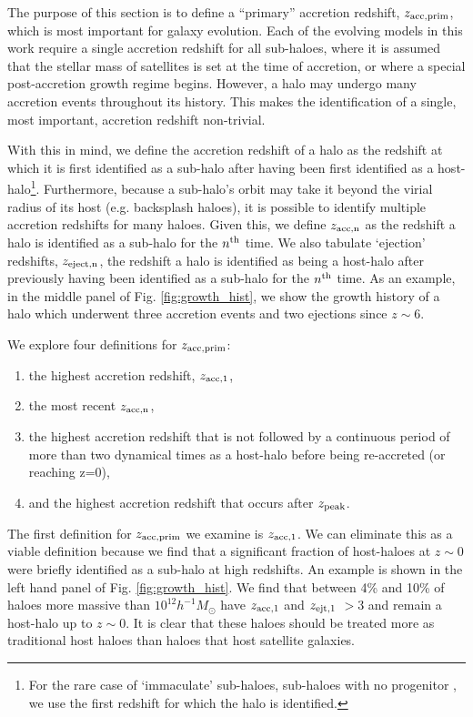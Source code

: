 \documentclass[useAMS,fleqn,usenatbib]{mnras}
\begin{document}
The purpose of this section is to define a ``primary'' accretion redshift, $z_{\rm acc, prim}$, which is most important for galaxy evolution.  Each of the evolving models in this work require a single accretion redshift for all sub-haloes, where it is assumed that the stellar mass of satellites is set at the time of accretion, or where a special post-accretion growth regime begins.  However, a halo may undergo many accretion events throughout its history.  This makes the identification of a single, most important, accretion redshift non-trivial.

With this in mind, we define the accretion redshift of a halo as the redshift at which it is first identified as a sub-halo after having been first identified as a host-halo\footnote{For the rare case of `immaculate' sub-haloes, sub-haloes with no progenitor \citep{vandenBosch:2017fj}, we use the first redshift for which the halo is identified.}.  Furthermore, because a sub-halo's orbit may take it beyond the virial radius of its host (e.g. backsplash haloes), it is possible to identify multiple accretion redshifts for many haloes.  Given this, we define $z_{\rm acc,n}$ as the redshift a halo is identified as a sub-halo for the $n^{\rm th}$ time.  We also tabulate `ejection' redshifts, $z_{\rm eject, n}$, the redshift a halo is identified as being a host-halo after previously having been identified as a sub-halo for the $n^{\rm th}$ time.  As an example, in the middle panel of Fig. \ref{fig:growth_hist}, we show the growth history of a halo which underwent three accretion events and two ejections since $z \sim 6$.

We explore four definitions for $z_{\rm acc, prim}$:
\begin{enumerate}
\item the highest accretion redshift, $z_{\rm acc,1}$, 
\item the most recent $z_{\rm acc, n}$, 
\item the highest accretion redshift that is not followed by a continuous period of more than two dynamical times as a host-halo before being re-accreted (or reaching z=0),
\item and the highest accretion redshift that occurs after $z_{\rm peak}$.  
\end{enumerate}

The first definition for $z_{\rm acc, prim}$ we examine is $z_{\rm acc,1}$.  We can eliminate this as a viable definition because we find that a significant fraction of host-haloes at $z\sim0$ were briefly identified as a sub-halo at high redshifts.  An example is shown in the left hand panel of Fig. \ref{fig:growth_hist}.  We find that between 4\% and 10\% of haloes more massive than $10^{12}h^{-1}M_{\odot}$ have $z_{\rm acc,1}$ and $z_{\rm ejt,1}$ $>3$ and remain a host-halo up to $z\sim0$.  It is clear that these haloes should be treated more as traditional host haloes than haloes that host satellite galaxies.   
\end{document}
